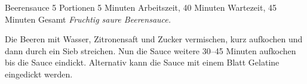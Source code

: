 \begin{recipe}{Beerensauce} {5 Portionen} {5 Minuten Arbeitszeit, 40 Minuten Wartezeit, 45 Minuten Gesamt}
  \freeform{}\textit{Fruchtig saure Beerensauce.}


  Die Beeren mit Wasser, Zitronensaft und Zucker vermischen, kurz aufkochen und dann durch ein Sieb streichen.
  Nun die Sauce weitere 30–45 Minuten aufkochen bis die Sauce eindickt.
  Alternativ kann die Sauce mit einem Blatt Gelatine eingedickt werden.

  \freeform{}\hrulefill{}
\end{recipe}
